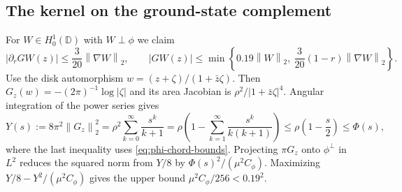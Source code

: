 \documentclass[11pt,a4paper,reqno]{amsart}
\theoremstyle{remark}
\numberwithin{equation}{section}
\newcommand{\norm}[1]{\left\|#1\right\|_2}
\newcommand{\Cphi}{C_\phi}
\newcommand{\D}{\mathbb D}
\begin{document}
\subsection{The kernel on the ground-state complement}
For $W\in H_0^1(\D)$ with $W\perp\phi$ we claim
\begin{equation}\label{eq:uniform-G}
  |\partial_r GW(z)|\le\frac{3}{20}\norm{\nabla W},
  \qquad
  |GW(z)|\le\min\left\{0.19\norm{W},\ \frac{3}{20}(1-r)\norm{\nabla W}\right\}.
\end{equation}
Use the disk automorphism $w=(z+\zeta)/(1+\bar z\zeta)$. Then
$G_z(w)=-(2\pi)^{-1}\log|\zeta|$ and its area Jacobian is
$\rho^2/|1+\bar z\zeta|^4$. Angular integration of the power series gives
\begin{equation}\label{eq:Y-exact}
  Y(s):=8\pi^2\norm{G_z}^2
   =\rho^2\sum_{k=0}^\infty\frac{s^k}{k+1}
   =\rho\left(1-\sum_{k=1}^\infty\frac{s^k}{k(k+1)}\right)
   \le\rho\left(1-\frac{s}{2}\right)\le\Phi(s),
\end{equation}
where the last inequality uses \eqref{eq:phi-chord-bounds}. Projecting
$\pi G_z$ onto $\phi^\perp$ in $L^2$ reduces the squared norm from $Y/8$
by $\Phi(s)^2/(\mu^2\Cphi)$. Maximizing $Y/8-Y^2/(\mu^2\Cphi)$ gives the
upper bound $\mu^2\Cphi/256<0.19^2$.
\end{document}
